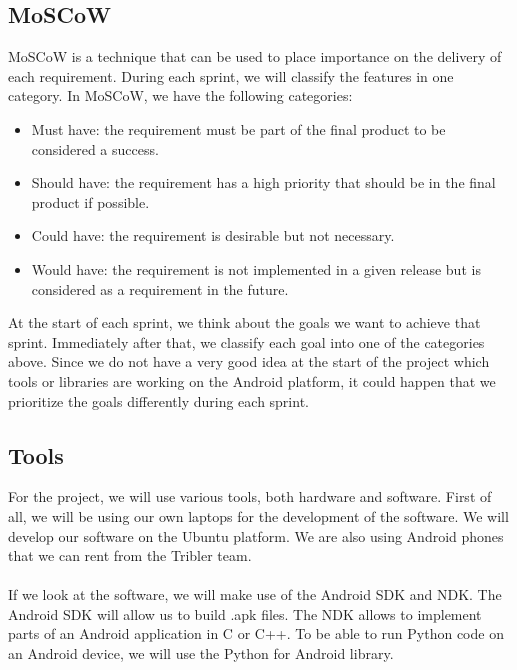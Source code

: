 \subsection{MoSCoW}
MoSCoW is a technique that can be used to place importance on the delivery of each requirement. During each sprint, we will classify the features in one category. In MoSCoW, we have the following categories:
\begin{itemize}
\item Must have: the requirement must be part of the final product to be considered a success.
\item Should have: the requirement has a high priority that should be in the final product if possible.
\item Could have: the requirement is desirable but not necessary.
\item Would have: the requirement is not implemented in a given release but is considered as a requirement in the future.
\end{itemize}
At the start of each sprint, we think about the goals we want to achieve that sprint. Immediately after that, we classify each goal into one of the categories above. Since we do not have a very good idea at the start of the project which tools or libraries are working on the Android platform, it could happen that we prioritize the goals differently during each sprint.

\subsection{Tools}
For the project, we will use various tools, both hardware and software. First of all, we will be using our own laptops for the development of the software. We will develop our software on the Ubuntu platform. We are also using Android phones that we can rent from the Tribler team.\\\\
If we look at the software, we will make use of the Android SDK and NDK. The Android SDK will allow us to build .apk files. The NDK allows to implement parts of an Android application in C or C++. To be able to run Python code on an Android device, we will use the Python for Android library.


